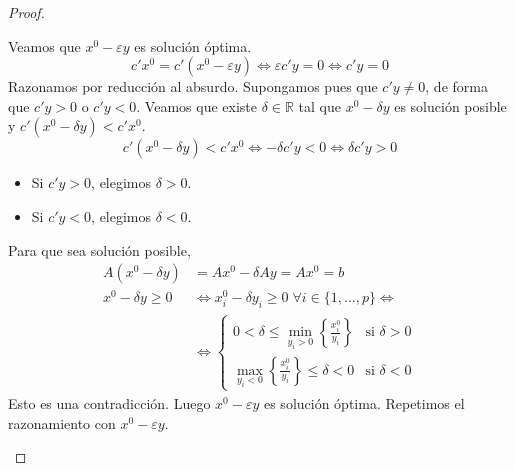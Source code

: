 \begin{proof}
\begin{enumerate}
\begin{enumerate}
                        Veamos que $x^0 - \varepsilon y$ es solución óptima.
                        $$c'x^0 = c'(x^0 - \varepsilon y) \Leftrightarrow \varepsilon c'y = 0 \Leftrightarrow c'y = 0$$
                        Razonamos por reducción al absurdo.
                        Supongamos pues que $c'y \neq 0$, de forma que $c'y > 0$ o $c'y < 0$.
                        Veamos que existe $\delta \in \mathbb{R}$ tal que $x^0 - \delta y$ es solución posible y $c'(x^0 - \delta y) < c'x^0$.
                        $$c'(x^0 - \delta y) < c'x^0 \Leftrightarrow -\delta c'y < 0 \Leftrightarrow \delta c'y > 0$$
                        \begin{itemize}
                            \item Si $c'y > 0$, elegimos $\delta > 0$.
                            \item Si $c'y < 0$, elegimos $\delta < 0$.
                        \end{itemize}
                        Para que sea solución posible,
                        \begin{align*}
                            A(x^0 - \delta y)     & = Ax^0 - \delta Ay = Ax^0 = b                                                                           \\
                            x^0 - \delta y \geq 0 & \Leftrightarrow x^0_i - \delta y_i \geq 0 \; \forall i \in \{1, \dots, p\} \Leftrightarrow              \\
                                                  & \Leftrightarrow \begin{cases}
                                                                        0 < \delta \leq \min_{y_i > 0} \left\{\frac{x^0_i}{y_i}\right\} & \text{si } \delta > 0 \\
                                                                        \max_{y_i < 0} \left\{\frac{x^0_i}{y_i}\right\} \leq \delta < 0 & \text{si } \delta < 0
                                                                    \end{cases}
                        \end{align*}
                        Esto es una contradicción.
                        Luego $x^0 - \varepsilon y$ es solución óptima.
                        Repetimos el razonamiento con $x^0 - \varepsilon y$.
              \end{enumerate}
    \end{enumerate}
\end{proof}

